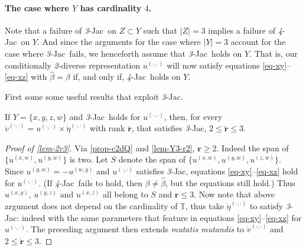 \documentclass[12pt,a4paper,twoside]{article}
\newcommand{\mbbt}{{\mathds {T}}}
\newcommand{\xy}{{(x, y)}}
\newcommand{\yz}{{(y,z)}}
\newcommand{\xz}{{(x,z)}}
\newcommand{\xw}{{(x,w)}}
\newcommand{\yw}{{(y,w)}}
\newcommand{\wy}{{(w,y)}}
\newcommand{\zw}{(z,w)}
\newcommand{\dd}{{(\cdot,\cdot)}}
\newcommand{\fourjac}{\textup{\textit{4}-Jac}}
\newcommand{\threejac}{\textup{\textit{3}-Jac}}
\begin{document}
\begin{appendices}
\paragraph{The case where $Y$ has cardinality $4$.\hskip-4pt} Note that a
failure of \threejac\ on $Z \subset Y$ such that $\lvert Z \rvert = 3$ implies a
failure of \fourjac\ on $Y$. And since the arguments for the case where
$\lvert Y \rvert = 3$ account for the case where \threejac\ fails, we henceforth
assume that \threejac\ holds on $Y$. That is, our conditionally \emph{2}-diverse
representation $u^{\dd}$ will now satisfy equations \eqref{eq-xy}--\eqref{eq-xz}
with $\hat{\beta} = \beta$ if, and only if, \fourjac\ holds on $Y$.

First some some useful results that exploit \threejac.
\begin{proposition}\label{lem-2r3}
  If $ Y = \{x, y, z, w\} $ and \threejac\ holds for $u^{\dd}$, then, for every
  $\acute{v}^{\dd} = u ^{\dd} \times \acute{\eta}^{\dd}$ with rank
  $ \acute{\mathbf r}$, that satisfies \threejac,
  $2\leq \acute{\mathbf r}\leq 3$.
\end{proposition}
\begin{proof}[Proof of \cref{lem-2r3}]
  Via \cref{prop-c2dQ} and \cref{lem-Y3-r2}, $\mathbf r \geq 2 $. Indeed the
  span of $\{ u^{\xw}, u^{\yw}\}$ is two. Let $S $ denote the span of
  $ \{u^{\xw}, u^{\yw} ,u^{\zw}\}$.  Since $u^{\yw} = - u^{\wy}$ and $ u ^{\dd}$
  satisfies \threejac, equations \eqref{eq-xy}--\eqref{eq-xz} hold for
  $u^{\dd}$.  (If \fourjac\ fails to hold, then $\beta \neq \hat \beta$, but the
  equations still hold.) Thus $u^{\xy}$, $u^{\yz}$ and $u^{\xz}$ all belong to
  $S$ and $\mathbf{r} \leq 3$. Now note that above argument does not depend on
  the cardinality of $\mbbt$, thus take $\acute{\eta}^{\dd}$ to
  satisfy \threejac: indeed with the same parameters that feature in
  equations \eqref{eq-xy}--\eqref{eq-xz} for $u^{\dd}$. The preceding
  argument then extends \emph{mutatis mutandis} to $\acute{v}^{\dd}$ and
  $2 \leq \acute{\mathbf r} \leq 3$.
\end{proof}


\end{appendices}
\end{document}
